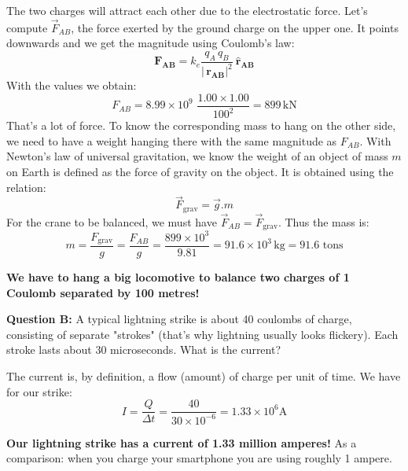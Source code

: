 \documentclass[12pt]{article}
\begin{document}
{\color{blue}
The two charges will attract each other due to the electrostatic force. Let's compute $\vec{F}_{AB}$, the force exerted by the ground charge on the upper one.
It points downwards and we get the magnitude using Coulomb's law:
\begin{equation}
 \mathbf{F_{AB}} = k_e \frac{q_A \, q_B}{| \, \mathbf{r_{AB}}|^2} \: \mathbf{\hat{r}_{AB}}
\end{equation}
With the values we obtain:
\begin{equation}
 F_{AB} = 8.99 \times 10^9 \, \, \frac{1.00 \times 1.00}{  100 ^2}  = 899 \, \text{kN}
\end{equation}
That's a lot of force. To know the corresponding mass to hang on the other side, we need to have a weight hanging there with the same magnitude as $F_{AB}$. 
With Newton's law of universal gravitation, we know the weight of an object of mass $m$ on Earth is defined as the force of gravity on the object. It is obtained using the relation:
\begin{equation}
 \vec{F}_\text{grav} = \vec{g} . m
\end{equation}
For the crane to be balanced, we must have $\vec{F}_{AB} = \vec{F}_\text{grav}$. Thus the mass is:
\begin{equation}
 m = \frac{F_\text{grav}}{g} = \frac{F_{AB}}{g} = \frac{899 \times 10^3}{9.81} = 91.6 \times 10^3 \, \text{kg} =  91.6 \, \, \text{tons}
\end{equation}

\textbf{We have to hang a big locomotive to balance two charges of 1 Coulomb separated by 100 metres!}
}
\newline

\textbf{Question B:} A typical lightning strike is about 40 coulombs of charge, consisting of separate "strokes" (that's why lightning usually looks flickery). Each stroke lasts about 30 microseconds. What is the current?\\

{\color{blue}
The current is, by definition, a flow (amount) of charge per unit of time. We have for our strike:
\begin{equation}
 I = \frac{Q}{\Delta t} = \frac{40 }{30 \times 10^{-6} } = 1.33 \times 10^6 \text{A}
\end{equation}

\textbf{Our lightning strike has a current of 1.33 million amperes!}
\newline
As a comparison: when you charge your smartphone you are using roughly 1 ampere.

}
\end{document}
